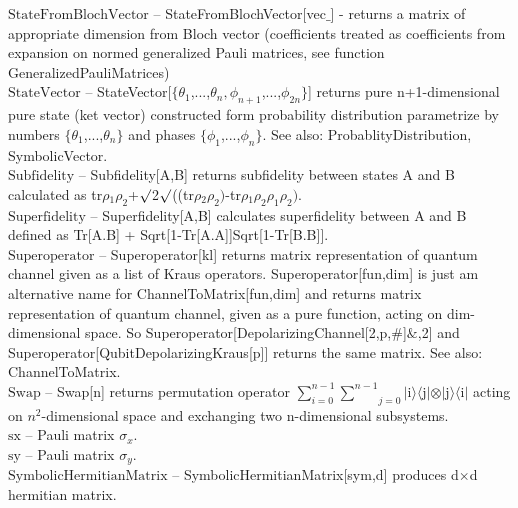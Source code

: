 \documentclass[a4paper,10pt]{scrartcl}
\begin{document}
\textbf{$ \text{StateFromBlochVector} $ }-- StateFromBlochVector[vec$\_$] - returns a matrix of appropriate dimension from Bloch vector (coefficients treated as coefficients from expansion on normed generalized Pauli matrices, see function GeneralizedPauliMatrices)$  $\\

\textbf{$ \text{StateVector} $ }-- StateVector[$\{$$ \theta _1 $,...,$ \theta _n,\phi _{n+1} $,...,$ \phi _{2 n} $$\}$] returns pure n+1-dimensional pure state (ket vector) constructed form probability distribution parametrize by numbers $\{$$ \theta _1 $,...,$ \theta _n $$\}$ and phases $\{$$ \phi _1 $,...,$ \phi _n $$\}$. See also: ProbablityDistribution, SymbolicVector.$  $\\

\textbf{$ \text{Subfidelity} $ }-- Subfidelity[A,B] returns subfidelity between states A and B calculated as $  $tr$\rho $$ _1\rho _2 $+$\surd $2$\surd $(($  $tr$\rho $$ _2\rho _2\text{)-} $tr$\rho $$ _1\rho _2\rho _1\rho _2\text{).} $\\

\textbf{$ \text{Superfidelity} $ }-- Superfidelity[A,B] calculates superfidelity between A and B defined as Tr[A.B] + Sqrt[1-Tr[A.A]]Sqrt[1-Tr[B.B]].$  $\\

\textbf{$ \text{Superoperator} $ }-- Superoperator[kl] returns matrix representation of quantum channel given as a list of Kraus operators. Superoperator[fun,dim] is just am alternative name for ChannelToMatrix[fun,dim] and returns matrix representation of quantum channel, given as a pure function, acting on dim-dimensional space. So Superoperator[DepolarizingChannel[2,p,$\#$]$\&$,2] and Superoperator[QubitDepolarizingKraus[p]] returns the same matrix. See also: ChannelToMatrix.$  $\\

\textbf{$ \text{Swap} $ }-- Swap[n] returns permutation operator $ \sum _{i=0}^{n-1} \underset{j=0}{\overset{n-1}{ \sum }} $$|$i$\rangle \langle $j$|\otimes |$j$\rangle \langle $i$|$ acting on $ n^2 $-dimensional space and exchanging two n-dimensional subsystems.$  $\\

\textbf{$ \text{sx} $ }-- Pauli matrix $ \sigma _x. $\\

\textbf{$ \text{sy} $ }-- Pauli matrix $ \sigma _y. $\\

\textbf{$ \text{SymbolicHermitianMatrix} $ }-- SymbolicHermitianMatrix[sym,d] produces d$\times $d hermitian matrix.$  $\\
\end{document}
